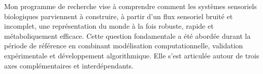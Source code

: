\documentclass[10pt,french,a4paper]{article}%
\begin{document}

Mon programme de recherche vise à comprendre comment les systèmes sensoriels biologiques parviennent à construire, à partir d'un flux sensoriel bruité et incomplet, une représentation du monde à la fois robuste, rapide et métaboliquement efficace. Cette question fondamentale a été abordée durant la période de référence en combinant modélisation computationnelle, validation expérimentale et développement algorithmique. Elle s'est articulée autour de trois axes complémentaires et interdépendants.
\end{document}
